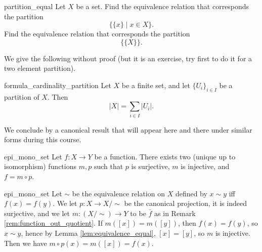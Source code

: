 \begin{cexp}{}{partition_equal}
    Let \( X \) be a set. Find the equivalence relation that corresponds the partition
    \begin{equation*}
        \{ \{ x\} \mid x \in X \}.
    \end{equation*}
    Find the equivalence relation that corresponds the partition
    \begin{equation*}
        \{ \{ X \} \}.
    \end{equation*}
\end{cexp}
We give the following without proof (but it is an exercise, try first to do it for a two element partition).
\begin{cprop}{}{formula_cardinality_partition}
    Let \( X \) be a finite set, and let \( \{U_i\}_{i\in I} \) be a partition of \( X \). Then
    \begin{equation*}
        |X| = \sum\limits_{i \in I} |U_i|.
    \end{equation*}
\end{cprop}

We conclude by a canonical result that will appear here and there under similar forms during this course.
\begin{cthm}{}{epi_mono_set}
    Let \( f : X \to Y \) be a function. There exists two (unique up to isomorphism) functions \( m, p \) such that \( p \) is surjective, \( m \) is injective, and \( f = m \circ p \). 
\end{cthm}
\begin{thmproof}{epi_mono_set}
    Let \( \sim \) be the equivalence relation on \( X \) defined by \( x \sim y \) iff \( f(x) = f(y) \). We let \( p : X \to X/\sim \) be the canonical projection, it is indeed surjective, and we let \( m : (X/\sim) \to Y \) to be \( \bar f \) as in Remark \ref{rem:function_out_quotient}. If \( m([x]) = m([y]) \), then \( f(x) = f(y) \), so \( x \sim y \), hence by Lemma \ref{lem:equivalence_equal}, \( [x] = [y] \), so \( m \) is injective. Then we have \( m\circ p(x) = m([x]) = f(x) \).
\end{thmproof}